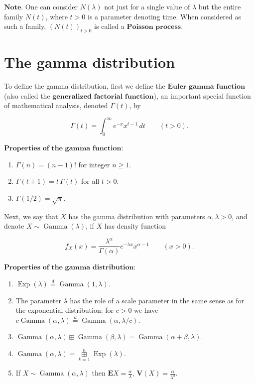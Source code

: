 \documentclass[11pt]{report}
\theoremstyle{plain}
\theoremstyle{definition}
\begin{document}
\noindent $\textbf{Note.}$ One can consider $N(\lambda)$ not
just for a single value of $\lambda$ but the entire
family $N(t)$, where $t>0$ is a parameter denoting
time. When considered as such a family, $(N(t))_{t>0}$
is called a $\textbf{Poisson process}$.

\section{The gamma distribution}

To define the gamma distribution, first we define the
$\textbf{Euler gamma function}$ (also called the
$\textbf{generalized factorial function}$), an
important special function of mathematical analysis,
denoted $\Gamma(t)$, by

\[
\Gamma(t) = \int_0^\infty e^{-x} x^{t-1}\,dt \qquad (t>0).
\]

\noindent $\textbf{Properties of the gamma function:}$

\begin{enumerate}[label=\arabic*.]
\item $\Gamma(n)=(n-1)!$ for integer $n\ge1$.

\item $\Gamma(t+1) = t\, \Gamma(t)$ for all $t>0$.

\item $\Gamma(1/2)=\sqrt{\pi}$.
\end{enumerate}

\noindent Next, we say that $X$ has the gamma distribution with
parameters $\alpha, \lambda>0$, and denote
$X\sim \operatorname{Gamma}(\lambda)$, if $X$ has
density function

\[
f_X(x) = \frac{\lambda^\alpha}{\Gamma(\alpha)} e^{-\lambda x} x^{\alpha-1} \qquad (x>0).
\]

\noindent $\textbf{Properties of the gamma distribution:}$

\begin{enumerate}[label=\arabic*.]
\item $\operatorname{Exp}(\lambda) \stackrel{d}{=}
\operatorname{Gamma}(1,\lambda)$.

\item The parameter $\lambda$ has the role of a scale
parameter in the same sense as for the exponential
distribution: for $c>0$ we have
$c \operatorname{Gamma}(\alpha,\lambda)
\stackrel{d}{=} \operatorname{Gamma}(\alpha,
\lambda/c)$.

\item $\operatorname{Gamma}(\alpha,\lambda) \boxplus
\operatorname{Gamma}(\beta,\lambda) =
\operatorname{Gamma}(\alpha+\beta,\lambda)$.

\item $\operatorname{Gamma}(\alpha,\lambda) =
\mathop{\boxplus}\limits_{k=1}^n
\operatorname{Exp}(\lambda)$.

\item If $X\sim \operatorname{Gamma}(\alpha,\lambda)$ then
$\mathbf{E} X = \frac{\alpha}{\lambda}$,
$\mathbf{V}(X) = \frac{\alpha}{\lambda^2}$.
\end{enumerate}
\end{document}
